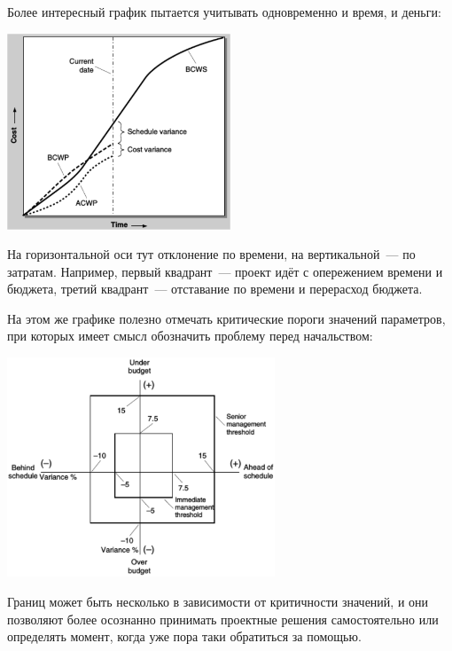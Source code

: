 \documentclass{../../text-style}
\begin{document}
Более интересный график пытается учитывать одновременно и время, и деньги:

\begin{center}
    \includegraphics[width=0.5\textwidth]{metricsGraph.png}
\end{center}

На горизонтальной оси тут отклонение по времени, на вертикальной~--- по затратам. Например, первый квадрант~--- проект идёт с опережением времени и бюджета, третий квадрант~--- отставание по времени и перерасход бюджета.

На этом же графике полезно отмечать критические пороги значений параметров, при которых имеет смысл обозначить проблему перед начальством:

\begin{center}
    \includegraphics[width=0.6\textwidth]{escalationThresholds.png}
\end{center}

Границ может быть несколько в зависимости от критичности значений, и они позволяют более осознанно принимать проектные решения самостоятельно или определять момент, когда уже пора таки обратиться за помощью. 
\end{document}
